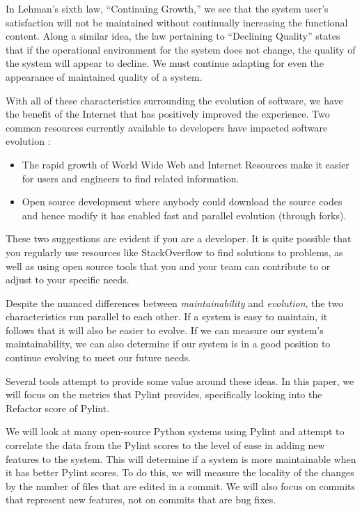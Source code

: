 \documentclass[12pt,conference]{IEEEtran}
\begin{document}
In Lehman's sixth law, ``Continuing Growth,'' we see that the system user's satisfaction will not be maintained without continually increasing the functional content. Along a similar idea, the law pertaining to ``Declining Quality'' states that if the operational environment for the system does not change, the quality of the system will appear to decline. We must continue adapting for even the appearance of maintained quality of a system.

With all of these characteristics surrounding the evolution of software, we have the benefit of the Internet that has positively improved the experience. Two common resources currently available to developers have impacted software evolution \cite{wiki:software-evolution}:

\begin{itemize}
    \item The rapid growth of World Wide Web and Internet Resources make it easier for users and engineers to find related information.
    \item Open source development where anybody could download the source codes and hence modify it has enabled fast and parallel evolution (through forks).
\end{itemize}

These two suggestions are evident if you are a developer. It is quite possible that you regularly use resources like StackOverflow to find solutions to problems, as well as using open source tools that you and your team can contribute to or adjust to your specific needs.

Despite the nuanced differences between \textit{maintainability} and \textit{evolution}, the two characteristics run parallel to each other. If a system is easy to maintain, it follows that it will also be easier to evolve. If we can measure our system's maintainability, we can also determine if our system is in a good position to continue evolving to meet our future needs.

Several tools attempt to provide some value around these ideas. In this paper, we will focus on the metrics that Pylint provides, specifically looking into the Refactor score of Pylint.

We will look at many open-source Python systems using Pylint and attempt to correlate the data from the Pylint scores to the level of ease in adding new features to the system. This will determine if a system is more maintainable when it has better Pylint scores. To do this, we will measure the locality of the changes by the number of files that are edited in a commit. We will also focus on commits that represent new features, not on commits that are bug fixes.
\end{document}
